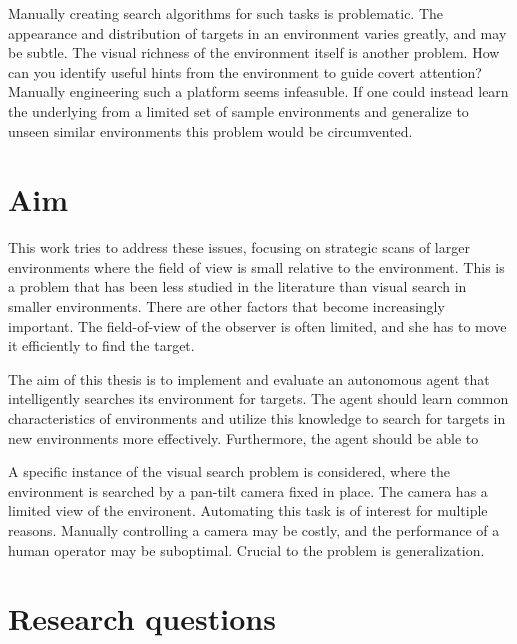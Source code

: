 Manually creating search algorithms for such tasks is problematic. The appearance and distribution of targets in an environment varies greatly, and may be subtle. The visual richness of the environment itself is another problem. How can you identify useful hints from the environment to guide covert attention? Manually engineering such a platform seems infeasuble. If one could instead learn the underlying from a limited set of sample environments and generalize to unseen similar environments this problem would be circumvented.





\section{Aim}
\label{sec:aim}

This work tries to address these issues, focusing on strategic scans of larger environments where the field of view is small relative to the environment. This is a problem that has been less studied in the literature than visual search in smaller environments. There are other factors that become increasingly important. The field-of-view of the observer is often limited, and she has to move it efficiently to find the target.

The aim of this thesis is to implement and evaluate an autonomous agent that intelligently searches its environment for targets. The agent should learn common characteristics of environments and utilize this knowledge to search for targets in new environments more effectively. Furthermore, the agent should be able to 

A specific instance of the visual search problem is considered, where the environment is searched by a pan-tilt camera fixed in place. The camera has a limited view of the environent. Automating this task is of interest for multiple reasons. Manually controlling a camera may be costly, and the performance of a human operator may be suboptimal. Crucial to the problem is generalization.

\section{Research questions}
\label{sec:research-questions}

